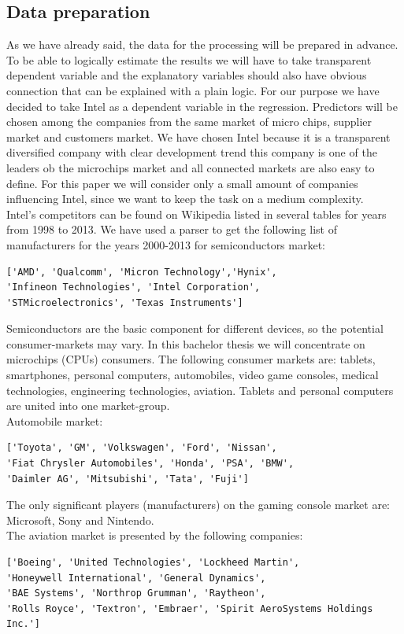 \documentclass [twoside,
  11pt, a4paper,
  footinclude=true,
  headinclude=true,
  cleardoublepage=empty
]{article}
\begin{document}
\subsection{Data preparation}
As we have already said, the data for the processing will be prepared in advance. To be able to logically estimate the results we will have to take transparent dependent variable and the explanatory variables should also have obvious connection that can be explained with a plain logic. For our purpose we have decided to take Intel as a dependent variable in the regression. Predictors will be chosen among the companies from the same market of micro chips, supplier market and customers market. We have chosen Intel because it is a transparent diversified company with clear development trend this company is one of the leaders ob the microchips market and all connected markets are also easy to define. For this paper we will consider only a small amount of companies influencing Intel, since we want to keep the task on a medium complexity.\\
Intel's competitors can be found on Wikipedia listed in several tables for years from 1998 to 2013. We have used a parser to get the following list of manufacturers for the years 2000-2013 for semiconductors market:
\begin{verbatim}
['AMD', 'Qualcomm', 'Micron Technology','Hynix',
'Infineon Technologies', 'Intel Corporation', 
'STMicroelectronics', 'Texas Instruments']
\end{verbatim}
Semiconductors are the basic component for different devices, so the potential consumer-markets may vary. In this bachelor thesis we will concentrate on microchips (CPUs) consumers. The following consumer markets are: tablets, smartphones, personal computers, automobiles, video game consoles, medical technologies, engineering technologies, aviation. Tablets and personal computers are united into one market-group.\\
Automobile market:
\begin{verbatim}
['Toyota', 'GM', 'Volkswagen', 'Ford', 'Nissan', 
'Fiat Chrysler Automobiles', 'Honda', 'PSA', 'BMW',
'Daimler AG', 'Mitsubishi', 'Tata', 'Fuji']
\end{verbatim}
The only significant players (manufacturers) on the gaming console market are: Microsoft, Sony and Nintendo.\\ 
The aviation market is presented by the following companies: 
\begin{verbatim}
['Boeing', 'United Technologies', 'Lockheed Martin',
'Honeywell International', 'General Dynamics',
'BAE Systems', 'Northrop Grumman', 'Raytheon',
'Rolls Royce', 'Textron', 'Embraer', 'Spirit AeroSystems Holdings Inc.']
\end{verbatim}
\end{document}
